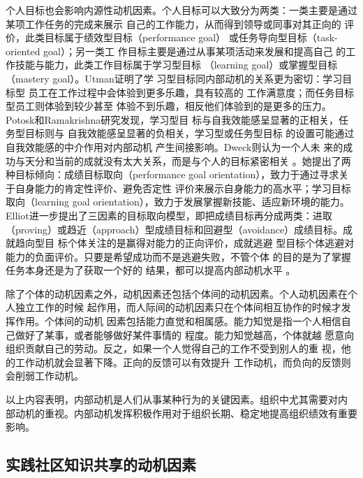 \documentclass[12pt,a4paper,cs4size]{ctexart}
\begin{document}
个人目标也会影响内源性动机因素。个人目标可以大致分为两类：一类主要是通过某项工作任务的完成来展示
自己的工作能力，从而得到领导或同事对其正向的
评价，此类目标属于绩效型目标（performance goal）
或任务导向型目标（task-oriented goal）；另一类工
作目标主要是通过从事某项活动来发展和提高自己
的工作技能与能力，此类工作目标属于学习型目标
（learning goal）或掌握型目标（mastery
goal）\cite{LairdJRawsthorne11011999}\cite{Pajares2000}。Utman证明了学
习型目标同内部动机的关系更为密切：学习目标型
员工在工作过程中会体验到更多乐趣，具有较高的
工作满意度；而任务目标型员工则体验到较少甚至
体验不到乐趣，相反他们体验到的是更多的压力\cite{ChristopherHUtman05011997}。Potosk和Ramakrishna研究发现，学习型目
标与自我效能感呈显著的正相关，任务型目标则与
自我效能感呈显著的负相关，学习型或任务型目标
的设置可能通过自我效能感的中介作用对内部动机
产生间接影响\cite{potosky2002mru}。Dweck则认为一个人未
来的成功与天分和当前的成就没有太大关系，而是与个人的目标紧密相关
\cite{dweck2000stt}。她提出了两种目标倾向：成绩目标取向（performance
goal orientation），致力于通过寻求关于自身能力的肯定性评价、避免否定性
评价来展示自身能力的高水平；学习目标取向（learning goal
orientation），致力于发展掌握新技能、适应新环境的能力。Elliot进一步提出了三因素的目标取向模型，即把成绩目标再分成两类：进取（proving）或趋近（approach）型成绩目标和回避型（avoidance）成绩目标\cite{elliot1996aaa}。成就趋向型目
标个体关注的是赢得对能力的正向评价，成就逃避
型目标个体逃避对能力的负面评价。只要是希望成功而不是逃避失败，不管个体
的目的是为了掌握任务本身还是为了获取一个好的
结果，都可以提高内部动机水平 。

除了个体的动机因素之外，动机因素还包括个体间的动机因素\cite{Hackman1975}\cite{Hackman1980}。个人动机因素在个人独立工作的时候
起作用，而人际间的动机因素只在个体间相互协作的时候才发挥作用。个体间的动机
因素包括能力直觉和相属感。能力知觉是指一个人相信自己做好了某事，或者能够做好某件事情的
程度\cite{harter1981nsr}\cite{bandura1982sem}。能力知觉越高，个体就越
愿意向组织贡献自己的劳动。反之，如果一个人觉得自己的工作不受到别人的重
视，他的工作动机就会显著下降\cite{Hertel2003}。正向的反馈可以有效提升
工作动机，而负向的反馈则会削弱工作动机。

以上内容表明，内部动机是人们从事某种行为的关键因素。组织中尤其需要对内
部动机的重视。内部动机发挥积极作用对于组织长期、稳定地提高组织绩效有重要
影响。


\subsection{实践社区知识共享的动机因素}
\end{document}
